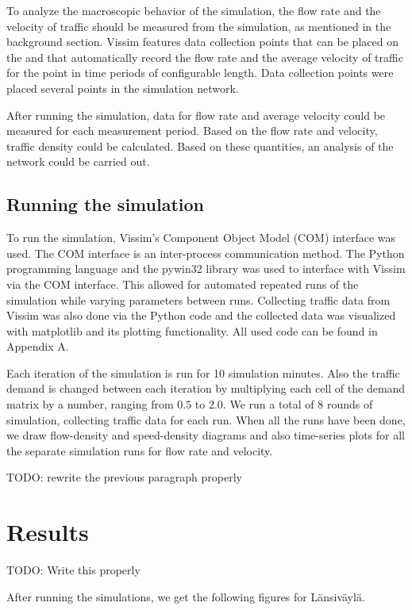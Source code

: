 \documentclass[english, 12pt, a4paper, elec, utf8, pdfa, online]{aaltothesis}
\begin{document}
To analyze the macroscopic behavior of the simulation, the flow rate and the velocity of traffic should be measured from the simulation, as mentioned in the background section. Vissim features data collection points that can be placed on the and that automatically record the flow rate and the average velocity of traffic for the point in time periods of configurable length. Data collection points were placed several points in the simulation network. 

After running the simulation, data for flow rate and average velocity could be measured for each measurement period. Based on the flow rate and velocity, traffic density could be calculated. Based on these quantities, an analysis of the network could be carried out.

\subsection{Running the simulation}

To run the simulation, Vissim's Component Object Model (COM) interface was used. The COM interface is an inter-process communication method. The Python programming language and the pywin32 library was used to interface with Vissim via the COM interface. This allowed for automated repeated runs of the simulation while varying parameters between runs. Collecting traffic data from Vissim was also done via the Python code and the collected data was visualized with matplotlib and its plotting functionality. All used code can be found in Appendix A.

Each iteration of the simulation is run for 10 simulation minutes. Also the traffic demand is changed between each iteration by multiplying each cell of the demand matrix by a number, ranging from $0.5$ to $2.0$. We run a total of 8 rounds of simulation, collecting traffic data for each run. When all the runs have been done, we draw flow-density and speed-density diagrams and also time-series plots for all the separate simulation runs for flow rate and velocity.

TODO: rewrite the previous paragraph properly

\clearpage

\section{Results}

TODO: Write this properly

After running the simulations, we get the following figures for Länsiväylä.
\end{document}
